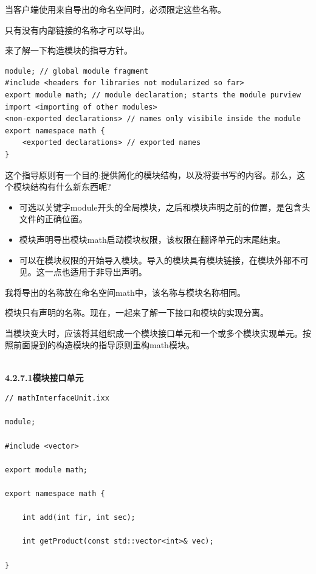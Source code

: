 当客户端使用来自导出的命名空间时，必须限定这些名称。

只有没有内部链接的名称才可以导出。


来了解一下构造模块的指导方针。

\begin{lstlisting}[style=styleCXX]
module; // global module fragment
#include <headers for libraries not modularized so far>
export module math; // module declaration; starts the module purview
import <importing of other modules>
<non-exported declarations> // names only visibile inside the module
export namespace math {
	<exported declarations> // exported names
}
\end{lstlisting}

这个指导原则有一个目的:提供简化的模块结构，以及将要书写的内容。那么，这个模块结构有什么新东西呢?

\begin{itemize}
\item 
可选以关键字module开头的全局模块，之后和模块声明之前的位置，是包含头文件的正确位置。

\item 
模块声明导出模块math启动模块权限，该权限在翻译单元的末尾结束。

\item 
可以在模块权限的开始导入模块。导入的模块具有模块链接，在模块外部不可见。这一点也适用于非导出声明。
\end{itemize}
 
我将导出的名称放在命名空间math中，该名称与模块名称相同。
 
模块只有声明的名称。现在，一起来了解一下接口和模块的实现分离。


当模块变大时，应该将其组织成一个模块接口单元和一个或多个模块实现单元。按照前面提到的构造模块的指导原则重构math模块。

\hspace*{\fill} \\ %
\noindent
\textbf{4.2.7.1\hspace{0.2cm}模块接口单元}

\begin{lstlisting}[style=styleCXX]
// mathInterfaceUnit.ixx

module;

#include <vector>

export module math;

export namespace math {

	int add(int fir, int sec);
	
	int getProduct(const std::vector<int>& vec);

}
\end{lstlisting}

